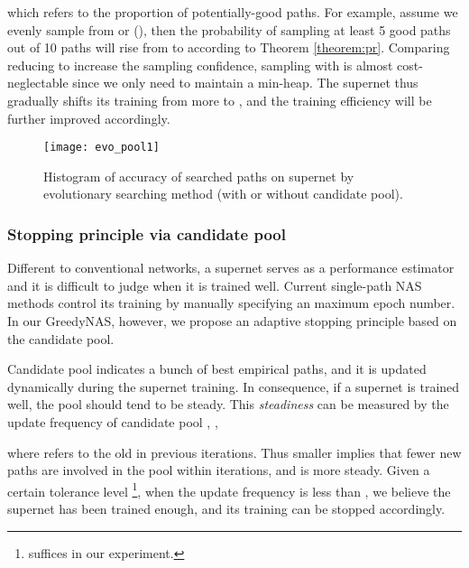 \documentclass[10pt,twocolumn,letterpaper]{article}
\begin{document}
which refers to the proportion of potentially-good paths. For example, assume we evenly sample from  or  (), then the probability of sampling at least 5 good paths out of 10 paths will rise from  to  according to Theorem \ref{theorem:pr}. Comparing reducing  to increase the sampling confidence, sampling with  is almost cost-neglectable since we only need to maintain a min-heap. The supernet thus gradually shifts its training from  more to , and the training efficiency will be further improved accordingly.






\begin{figure}[t]
	\centering
	\texttt{[image: evo\_pool1]}
	\vspace{-3mm}
	\caption{Histogram of accuracy of searched paths on supernet by evolutionary searching method (with or without candidate pool).}
	\vspace{-5mm}
	\label{fig:population}
\end{figure}






\subsubsection{Stopping principle via candidate pool}
Different to conventional networks, a supernet serves as a performance estimator and it is difficult to judge when it is trained well. Current single-path NAS methods control its training by manually specifying an maximum epoch number. In our GreedyNAS, however, we propose an adaptive stopping principle based on the candidate pool. 

Candidate pool  indicates a bunch of best empirical paths, and it is updated dynamically during the supernet training. In consequence, if a supernet is trained well, the pool  should tend to be steady. This \textit{steadiness} can be measured by the update frequency  of candidate pool , \ie,

where  refers to the old  in previous  iterations. Thus smaller  implies that fewer new paths are involved in the pool  within  iterations, and  is more steady. Given a certain tolerance level \footnote{ suffices in our experiment.}, when the update frequency  is less than , we believe the supernet has been trained enough, and its training can be stopped accordingly.  
\end{document}
